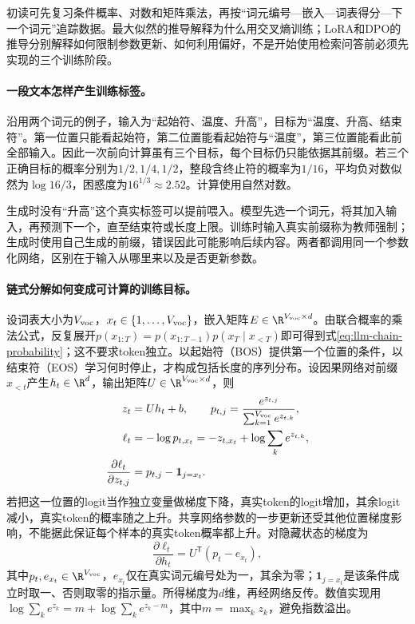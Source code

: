 初读可先复习条件概率、对数和矩阵乘法，再按“词元编号—嵌入—词表得分—下一个词元”追踪数据。最大似然的推导解释为什么用交叉熵训练；LoRA和DPO的推导分别解释如何限制参数更新、如何利用偏好，不是开始使用检索问答前必须先实现的三个训练阶段。

\paragraph{一段文本怎样产生训练标签。}
沿用两个词元的例子，输入为“起始符、温度、升高”，目标为“温度、升高、结束符”。第一位置只能看起始符，第二位置能看起始符与“温度”，第三位置能看此前全部输入。因此一次前向计算虽有三个目标，每个目标仍只能依据其前缀。若三个正确目标的概率分别为$1/2,1/4,1/2$，整段含终止符的概率为$1/16$，平均负对数似然为$\log16/3$，困惑度为$16^{1/3}\approx2.52$。计算使用自然对数。

生成时没有“升高”这个真实标签可以提前喂入。模型先选一个词元，将其加入输入，再预测下一个，直至结束符或长度上限。训练时输入真实前缀称为教师强制；生成时使用自己生成的前缀，错误因此可能影响后续内容。两者都调用同一个参数化网络，区别在于输入从哪里来以及是否更新参数。

\paragraph{链式分解如何变成可计算的训练目标。}
设词表大小为$V_{\rm voc}$，$x_t\in\{1,\ldots,V_{\rm voc}\}$，嵌入矩阵$E\in\R^{V_{\rm voc}\times d}$。由联合概率的乘法公式，反复展开$p(x_{1:T})=p(x_{1:T-1})p(x_T\mid x_{<T})$即可得到式\eqref{eq:llm-chain-probability}；这不要求token独立。以起始符（BOS）提供第一个位置的条件，以结束符（EOS）学习何时停止，才构成包括长度的序列分布。设因果网络对前缀$x_{<t}$产生$h_t\in\R^d$，输出矩阵$U\in\R^{V_{\rm voc}\times d}$，则
\begin{align}
 z_t&=Uh_t+b,\qquad p_{t,j}=\frac{e^{z_{t,j}}}{\sum_{k=1}^{V_{\rm voc}}e^{z_{t,k}}},\\
 \ell_t&=-\log p_{t,x_t}=-z_{t,x_t}+\log\sum_ke^{z_{t,k}},\\
 \frac{\partial\ell_t}{\partial z_{t,j}}&=p_{t,j}-\mathbf1_{j=x_t}.
\end{align}
若把这一位置的logit当作独立变量做梯度下降，真实token的logit增加，其余logit减小，真实token的概率随之上升。共享网络参数的一步更新还受其他位置梯度影响，不能据此保证每个样本的真实token概率都上升。对隐藏状态的梯度为
\begin{equation}
 \frac{\partial\ell_t}{\partial h_t}=U^{\mathsf T}(p_t-e_{x_t}),
\end{equation}
其中$p_t,e_{x_t}\in\R^{V_{\rm voc}}$，$e_{x_t}$仅在真实词元编号处为一，其余为零；$\mathbf1_{j=x_t}$是该条件成立时取一、否则取零的指示量。所得梯度为$d$维，再经网络反传。数值实现用$\log\sum_ke^{z_k}=m+\log\sum_ke^{z_k-m}$，其中$m=\max_k z_k$，避免指数溢出。

